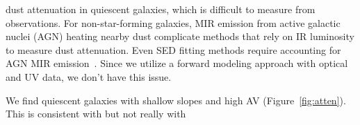 
dust attenuation in quiescent galaxies, which is difficult to measure from
observations. For non-star-forming galaxies, MIR emission from active galactic nuclei (AGN)
heating nearby dust complicate methods that rely on IR luminosity to measure
dust attenuation. Even SED fitting methods require accounting for AGN MIR 
emission~\citep{salim2016, leja2018, salim2018}. 
Since we utilize a forward modeling approach with optical and UV data, we don't
have this issue. 

We find quiescent galaxies with shallow slopes and high AV
(Figure~\ref{fig:atten}). This is consistent
with \cite{leja2017} but not really with \cite{salim2018}  





